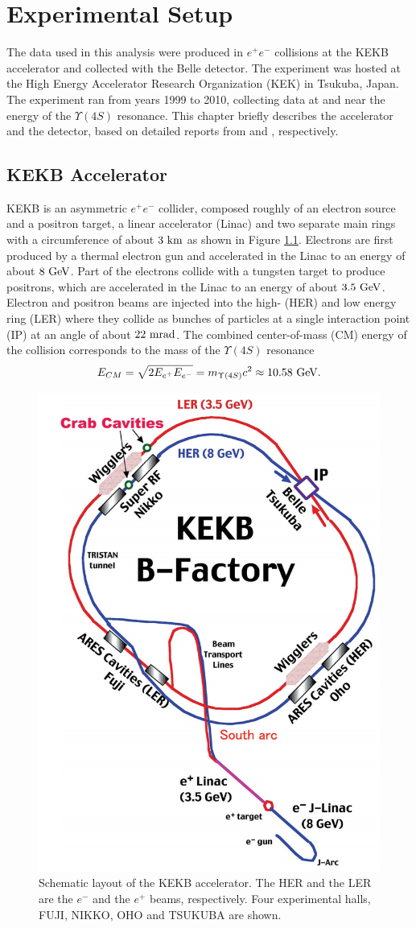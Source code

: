 \chapter{Experimental Setup}
The data used in this analysis were produced in $e^+e^-$ collisions at the KEKB accelerator and collected with the Belle detector. The experiment was hosted at the High Energy Accelerator Research Organization (KEK) in Tsukuba, Japan. The experiment ran
from years 1999 to 2010, collecting data at and near the energy of the $\Upsilon(4S)$ resonance. This chapter briefly describes the accelerator and the detector, based on detailed reports from \cite{doi:10.1093/ptep/pts102} and \cite{ABASHIAN2002117}, respectively.


\section{KEKB Accelerator}
KEKB is an asymmetric $e^+e^-$ collider, composed roughly of an electron source and a positron target, a linear accelerator (Linac) and two separate main rings with a circumference of about $3\mathrm{~km}$ as shown in Figure \ref{fig:kekb}. Electrons are first produced by a thermal electron gun and accelerated in the Linac to an energy of about $8\mathrm{~GeV}$. Part of the electrons collide with a tungsten target to produce positrons, which are accelerated in the Linac to an energy of about $3.5\mathrm{~GeV}$. Electron and positron beams are injected into the high- (HER) and low energy ring (LER) where they collide as bunches of particles at a single interaction point (IP) at an angle of about $22\mathrm{~mrad}$. The combined center-of-mass (CM) energy of the collision corresponds to the mass of the $\Upsilon(4S)$ resonance
\begin{equation}
E_{CM} = \sqrt{2E_{e^+}E_{e^-}} = m_{\Upsilon(4S)}c^2 \approx 10.58\mathrm{~GeV}.
\end{equation}

\begin{figure}[!htb]
	\centering
	\captionsetup{width=0.8\linewidth}
	\includegraphics[width=0.5\linewidth]{fig/setup/KEKB}
	\caption{Schematic layout of the KEKB accelerator. The HER and the LER are the $e^-$ and the $e^+$ beams, respectively. Four experimental halls, FUJI, NIKKO, OHO and TSUKUBA are shown.}
	\label{fig:kekb}
\end{figure}

